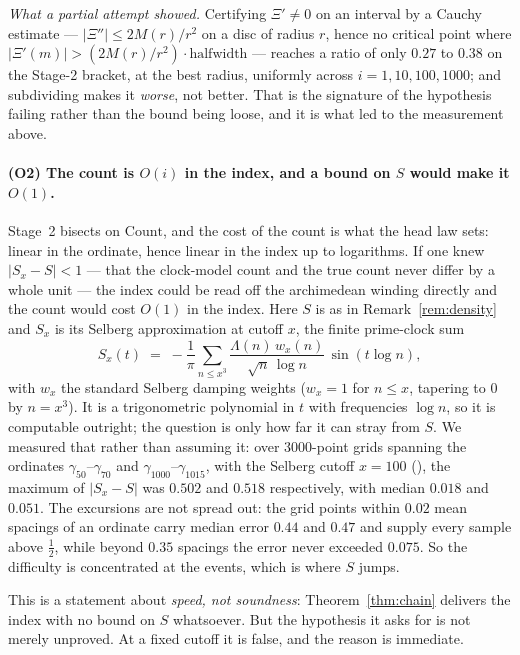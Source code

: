 \documentclass[11pt]{article}
\theoremstyle{plain}
\theoremstyle{definition}
\theoremstyle{remark}
\newcommand{\lean}[1]{\texttt{\detokenize{#1}}}
\begin{document}
\emph{What a partial attempt showed.} Certifying $\Xi'\ne0$ on an interval by a Cauchy
estimate --- $\lvert\Xi''\rvert\le2M(r)/r^{2}$ on a disc of radius $r$, hence no
critical point where $\lvert\Xi'(m)\rvert>(2M(r)/r^{2})\cdot\text{halfwidth}$ --- reaches
a ratio of only $0.27$ to $0.38$ on the Stage-2 bracket, at the best radius, uniformly
across $i=1,10,100,1000$; and subdividing makes it \emph{worse}, not better. That is
the signature of the hypothesis failing rather than the bound being loose, and it is
what led to the measurement above.

\paragraph{(O2) The count is $O(i)$ in the index, and a bound on $S$ would make it
$O(1)$.}
Stage~2 bisects on $\mathrm{Count}$, and the cost of the count is what the head law
sets: linear in the ordinate, hence linear in the index up to logarithms. If one knew
$\lvert S_x-S\rvert<1$ --- that the clock-model count and the true count never differ
by a whole unit --- the index could be read off the archimedean winding directly and
the count would cost $O(1)$ in the index. Here $S$ is as in Remark~\ref{rem:density}
and $S_x$ is its Selberg approximation at cutoff $x$, the finite prime-clock sum
\[
  S_x(t)\;=\;-\frac1\pi\sum_{n\le x^{3}}
      \frac{\Lambda(n)\,w_x(n)}{\sqrt n\,\log n}\,\sin(t\log n),
\]
with $w_x$ the standard Selberg damping weights ($w_x=1$ for $n\le x$, tapering to $0$
by $n=x^{3}$). It is a trigonometric polynomial in $t$ with frequencies $\log n$, so it
is computable outright; the question is only how far it can stray from $S$.
We measured that rather than assuming
it: over $3000$-point grids spanning the ordinates $\gamma_{50}$--$\gamma_{70}$ and
$\gamma_{1000}$--$\gamma_{1015}$, with the Selberg cutoff $x=100$
(\lean{extractor/checks/count_error_grid.py}), the maximum of $\lvert S_x-S\rvert$ was
$0.502$ and $0.518$ respectively, with median $0.018$ and $0.051$. The excursions are
not spread out: the grid points within $0.02$ mean spacings of an ordinate carry
median error $0.44$ and $0.47$ and supply every sample above $\tfrac12$, while beyond
$0.35$ spacings the error never exceeded $0.075$. So the difficulty is concentrated at
the events, which is where $S$ jumps.

This is a statement about \emph{speed, not soundness}: Theorem~\ref{thm:chain} delivers
the index with no bound on $S$ whatsoever. But the hypothesis it asks for is not merely
unproved. At a fixed cutoff it is false, and the reason is immediate.
\end{document}
